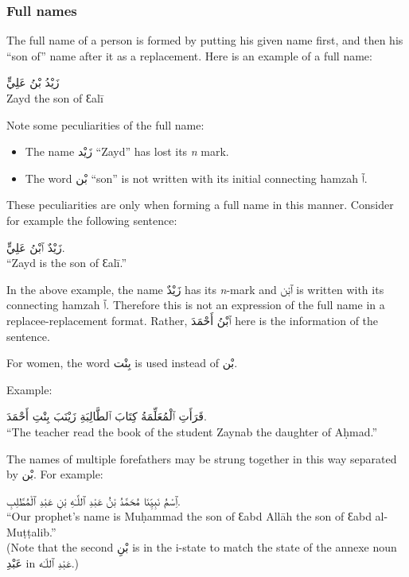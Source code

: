 \documentclass[
  10pt,
]{book}
\providecommand{\tightlist}{%
  \setlength{\itemsep}{0pt}\setlength{\parskip}{0pt}}
\begin{document}
\subsubsection{Full names}\label{full-names}

The full name of a person is formed by putting his given name first, and then his \enquote{son of} name after it as a replacement. Here is an example of a full name:

\foreignlanguage{arabic}{زَيْدُ بْنُ عَلِيٍّ}\\
Zayd the son of Ɛalī

Note some peculiarities of the full name:

\begin{itemize}
\tightlist
\item
  The name \foreignlanguage{arabic}{زَيْد} \enquote{Zayd} has lost its \emph{n} mark.
\item
  The word \foreignlanguage{arabic}{بْن} \enquote{son} is not written with its initial connecting hamzah \foreignlanguage{arabic}{ٱ}.
\end{itemize}

These peculiarities are only when forming a full name in this manner. Consider for example the following sentence:

\foreignlanguage{arabic}{زَيْدٌ ٱبْنُ عَلِيٍّ.}\\
\enquote{Zayd is the son of Ɛalī.}

In the above example, the name \foreignlanguage{arabic}{زَيْدٌ} has its \emph{n}-mark and \foreignlanguage{arabic}{ٱبْن} is written with its connecting hamzah \foreignlanguage{arabic}{ٱ}. Therefore this is not an expression of the full name in a replacee-replacement format. Rather, \foreignlanguage{arabic}{ٱبْنُ أَحْمَدَ} here is the information of the sentence.

For women, the word \foreignlanguage{arabic}{بِنْت} is used instead of \foreignlanguage{arabic}{بْن}.

Example:

\foreignlanguage{arabic}{قَرَأَتِ ٱلْمُعَلِّمَةُ کِتَابَ ٱلطَّالِبَةِ زَيْنَبَ بِنْتِ أَحْمَدَ.}\\
\enquote{The teacher read the book of the student Zaynab the daughter of Aḥmad.}

The names of multiple forefathers may be strung together in this way separated by \foreignlanguage{arabic}{بْن}. For example:

\foreignlanguage{arabic}{ٱِسْمُ نَبِيِّنَا مُحَمَّدُ بْنُ عَبْدِ ٱللَّـٰهِ بْنِ عَبْدِ ٱلْمُطَّلِبِ.}\\
\enquote{Our prophet's name is Muḥammad the son of Ɛabd Allāh the son of Ɛabd al-Muṭṭalib.}\\
(Note that the second \foreignlanguage{arabic}{بْنِ} is in the i-state to match the state of the annexe noun \foreignlanguage{arabic}{عَبْدِ} in \foreignlanguage{arabic}{عَبْدِ ٱللّـٰه}.)
\end{document}
